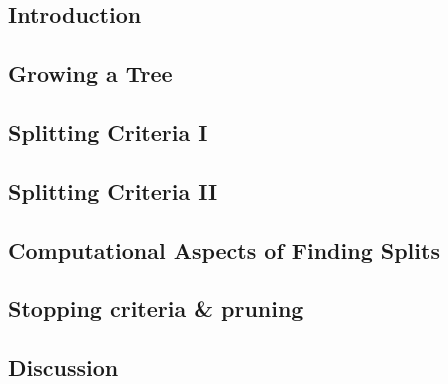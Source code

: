 

\subsection{Introduction}


\subsection{Growing a Tree}


\subsection{Splitting Criteria I}


\subsection{Splitting Criteria II}


\subsection{Computational Aspects of Finding Splits}


\subsection{Stopping criteria \& pruning}


\subsection{Discussion}

